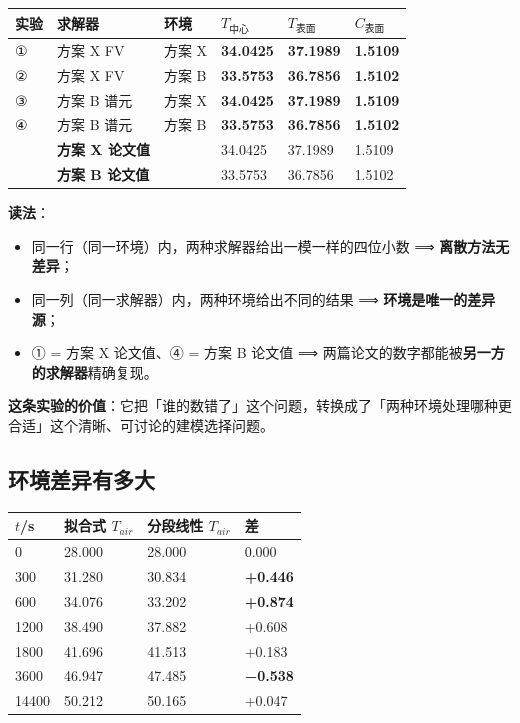 \begin{center}
\small
\begin{tabular}{llllll}
\toprule
实验 & 求解器 & 环境 & $T_{中心}$ & $T_{表面}$ & $C_{表面}$ \\
\midrule
① & 方案 X FV & 方案 X & \textbf{34.0425} & \textbf{37.1989} & \textbf{1.5109} \\
② & 方案 X FV & 方案 B & \textbf{33.5753} & \textbf{36.7856} & \textbf{1.5102} \\
③ & 方案 B 谱元 & 方案 X & \textbf{34.0425} & \textbf{37.1989} & \textbf{1.5109} \\
④ & 方案 B 谱元 & 方案 B & \textbf{33.5753} & \textbf{36.7856} & \textbf{1.5102} \\
 & \textbf{方案 X 论文值} &  & 34.0425 & 37.1989 & 1.5109 \\
 & \textbf{方案 B 论文值} &  & 33.5753 & 36.7856 & 1.5102 \\
\bottomrule
\end{tabular}
\end{center}


\textbf{读法}：


\begin{itemize}
\item 同一行（同一环境）内，两种求解器给出一模一样的四位小数 ⟹ \textbf{离散方法无差异}；
\item 同一列（同一求解器）内，两种环境给出不同的结果 ⟹ \textbf{环境是唯一的差异源}；
\item ① = 方案 X 论文值、④ = 方案 B 论文值 ⟹ 两篇论文的数字都能被\textbf{另一方的求解器}精确复现。
\end{itemize}


\textbf{这条实验的价值}：它把「谁的数错了」这个问题，转换成了「两种环境处理哪种更合适」这个清晰、可讨论的建模选择问题。


\subsection{环境差异有多大}


\begin{center}
\small
\begin{tabular}{llll}
\toprule
$t$/s & 拟合式 $T_{air}$ & 分段线性 $T_{air}$ & 差 \\
\midrule
0 & 28.000 & 28.000 & 0.000 \\
300 & 31.280 & 30.834 & \textbf{+0.446} \\
600 & 34.076 & 33.202 & \textbf{+0.874} \\
1200 & 38.490 & 37.882 & +0.608 \\
1800 & 41.696 & 41.513 & +0.183 \\
3600 & 46.947 & 47.485 & \textbf{−0.538} \\
14400 & 50.212 & 50.165 & +0.047 \\
\bottomrule
\end{tabular}
\end{center}


